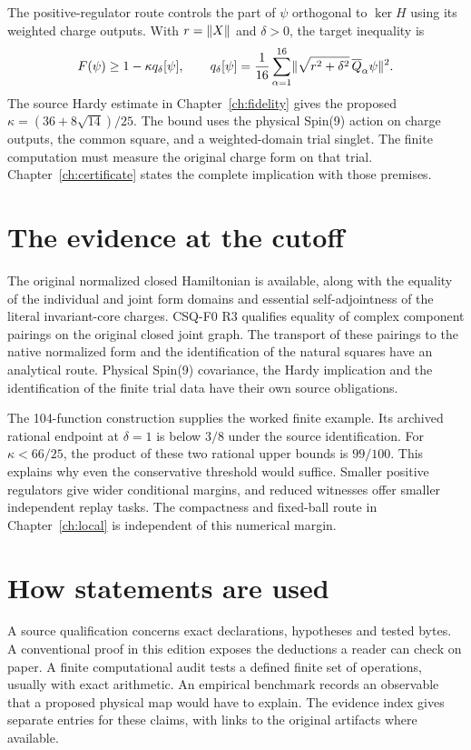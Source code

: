 The positive-regulator route controls the part of $\psi$ orthogonal to $\ker H$ using its weighted charge outputs. With $r=\lVert X\rVert$ and $\delta>0$, the target inequality is
\begin{equation}
 F(\psi)\ge 1-\kappa q_\delta[\psi],
 \qquad
 q_\delta[\psi]=\frac1{16}\sum_{\alpha=1}^{16}
      \lVert \sqrt{r^2+\delta^2}\,\overline Q_\alpha\psi\rVert^{2}.
 \label{eq:target}
\end{equation}
The source Hardy estimate in Chapter~\ref{ch:fidelity} gives the proposed $\kappa=(36+8\sqrt{14})/25$. The bound uses the physical Spin(9) action on charge outputs, the common square, and a weighted-domain trial singlet. The finite computation must measure the original charge form on that trial. Chapter~\ref{ch:certificate} states the complete implication with those premises.

\section{The evidence at the cutoff}
The original normalized closed Hamiltonian is available, along with the equality of the individual and joint form domains and essential self-adjointness of the literal invariant-core charges. CSQ-F0 R3 qualifies equality of complex component pairings on the original closed joint graph. The transport of these pairings to the native normalized form and the identification of the natural squares have an analytical route. Physical Spin(9) covariance, the Hardy implication and the identification of the finite trial data have their own source obligations.

The 104-function construction supplies the worked finite example. Its archived rational endpoint at $\delta=1$ is below $3/8$ under the source identification. For $\kappa<66/25$, the product of these two rational upper bounds is $99/100$. This explains why even the conservative threshold would suffice. Smaller positive regulators give wider conditional margins, and reduced witnesses offer smaller independent replay tasks. The compactness and fixed-ball route in Chapter~\ref{ch:local} is independent of this numerical margin.

\section{How statements are used}
A source qualification concerns exact declarations, hypotheses and tested bytes. A conventional proof in this edition exposes the deductions a reader can check on paper. A finite computational audit tests a defined finite set of operations, usually with exact arithmetic. An empirical benchmark records an observable that a proposed physical map would have to explain. The evidence index gives separate entries for these claims, with links to the original artifacts where available.

